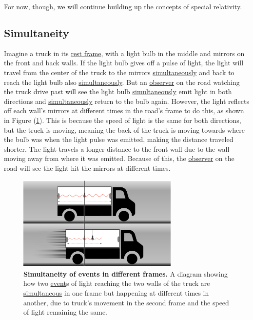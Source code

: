 For now, though, we will continue building up the concepts of special relativity.


\subsection{Simultaneity} \label{subsect: Simultaneity}

Imagine a truck in its \hyperlink{def-proper-frame}{rest frame}, with a light bulb in the middle and mirrors on the front and back walls.
If the light bulb gives off a pulse of light, the light will travel from the center of the truck to the mirrors \hyperlink{def-simultaneity}{simultaneously} and back to reach the light bulb also \hyperlink{def-simultaneity}{simultaneously}.
But an \hyperlink{def-observer}{observer} on the road watching the truck drive past will see the light bulb \hyperlink{def-simultaneity}{simultaneously} emit light in both directions and \hyperlink{def-simultaneity}{simultaneously} return to the bulb again.
However, the light reflects off each wall's mirrors at different times in the road's frame to do this, as shown in Figure (\ref{fig: truck simultaneity}).
This is because the speed of light is the same for both directions, but the truck is moving, meaning the back of the truck is moving towards where the bulb was when the light pulse was emitted, making the distance traveled shorter.
The light travels a longer distance to the front wall due to the wall moving away from where it was emitted.
Because of this, the \hyperlink{def-observer}{observer} on the road will see the light hit the mirrors at different times.

\begin{figure}[htbp]
	\centering
	\includegraphics[width = 8cm]{images/pdf/lorry_simul.pdf}
	\caption{\textbf{Simultaneity of events in different frames.} A diagram showing how two \protect\hyperlink{def-event}{event}s of light reaching the two walls of the truck are \protect\hyperlink{def-simultaneity}{simultaneous} in one frame but happening at different times in another, due to truck's movement in the second frame and the speed of light remaining the same.}
	\label{fig: truck simultaneity}
\end{figure}

